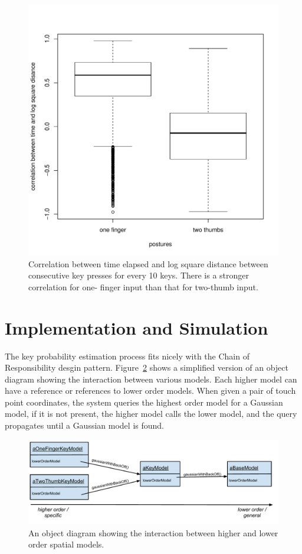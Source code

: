 \documentclass{sigchi}
\begin{document}
\begin{figure}[tb]
  \centering
  \includegraphics[width=1\columnwidth]{figures/boxplot.pdf}
  \caption{Correlation between time elapsed and log square distance between
  consecutive key presses for every 10 keys. There is a stronger correlation for
  one- finger input than that for two-thumb input.}
  \label{fig:boxplot}
\end{figure}

\section{Implementation and Simulation}
The key probability estimation process fits nicely with the
Chain of Responsibility desgin pattern.
Figure~\ref{fig:chain-of-responsibility} shows a simplified version of an object
diagram showing the interaction between various models. Each higher model can
have a reference or references to lower order models. When given a pair of touch
point coordinates, the system queries the highest order model for a Gaussian
model, if it is not present, the higher model calls the lower model, and the
query propagates until a Gaussian model is found.

\begin{figure}[tb]
  \centering
  \includegraphics[width=1\columnwidth]{figures/chain-of-responsibility.pdf}
  \caption{An object diagram showing the interaction between higher and lower
  order spatial models.}
  \label{fig:chain-of-responsibility}
\end{figure}
\end{document}
